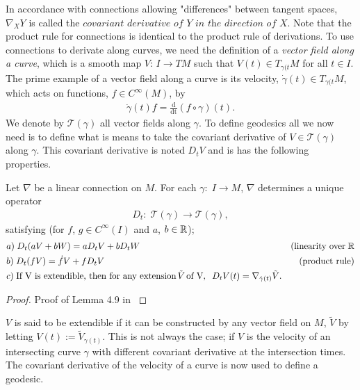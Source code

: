In accordance with connections allowing "differences" between tangent spaces, $ \nabla_X Y $ is called the $\textit{covariant derivative of Y in the direction of X}$. Note that the product rule for connections is identical to the product rule of derivations. To use connections to derivate along curves, we need the definition of a \textit{vector field along a curve}, which is a smooth map $V: \, I \rightarrow TM$ such that $V(t) \in T_{\gamma(t} M$ for all $t \in I$. The prime example of a vector field along a curve is its velocity, $\dot{\gamma}(t) \in T_{\gamma(t} M$, which acts on functions, $f \in C^\infty(M)$, by
\begin{align*}
\dot{\gamma}(t) f = \frac{\text{d}}{\text{dt}} (f \circ \gamma)(t).
\end{align*} 
We denote by $\mathcal{T}(\gamma)$ all vector fields along $\gamma$. 
To define geodesics all we now need is to define what is means to take the covariant derivative of $V \in \mathcal{T}(\gamma)$ along $\gamma$. This covariant derivative is noted $D_t V$ and is has the following properties.

\begin{lemma}
Let $\nabla$ be a linear connection on $M$. For each $\gamma: \; I \rightarrow M$, $\nabla$ determines a unique operator
\begin{align*}
D_t: \; \mathcal{T}(\gamma) \rightarrow \mathcal{T}(\gamma),
\end{align*} 
satisfying (for $f$, $g \in C^\infty(I)$ and $a$, $b \in \mathbb{R}$);
\begin{align*}
& a) \; D_t(aV + bW) = aD_tV + bD_tW \; \; \; \; & \text{(linearity over} \; \mathbb{R} \\
& b) \; D_t(fV) = \dot{f}V + fD_tV & \text{(product rule)} \\
& c) \; \text{If V is extendible, then for any extension} \, \tilde{V} \, \text{of V}, \; \; D_tV(t) = \nabla_{\dot{\gamma}(t)} \tilde{V}.
\end{align*}
\end{lemma}
\begin{proof}
Proof of Lemma 4.9 in \citet{RiemannLee}
\end{proof}

$V$ is said to be extendible if it can be constructed by any vector field on $M$, $\tilde{V}$ by letting $V(t) := \tilde{V}_{\gamma(t)}$. This is not always the case; if $V$ is the velocity of an intersecting curve $\gamma$ with different covariant derivative at the intersection times. The covariant derivative of the velocity of a curve is now used to define a geodesic.

